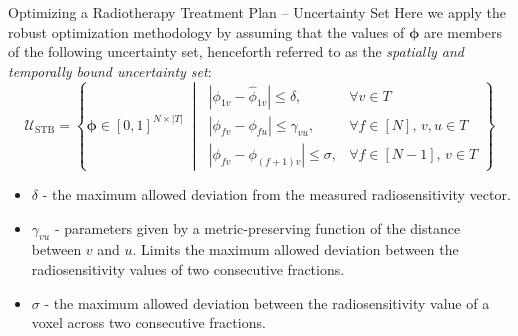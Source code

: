 \documentclass[11pt]{beamer}
\newcommand{\stb}{\mathcal{U}_{\text{STB}}}
\begin{document}
\begin{frame}{Optimizing a Radiotherapy Treatment Plan – Uncertainty Set}
        Here we apply the robust optimization methodology by assuming that the values of $\bm{\phi}$ are members of the following uncertainty set, henceforth referred to as the \textit{spatially and temporally bound uncertainty set}:
        \vspace{0.5em}
        \small{
        \[
        \stb =
        \left\{
        \bm{\phi} \in [0, 1]^{N \times |T|} \;\middle|\;
        \begin{array}{ll}
        |\phi_{1v} - \hat{\phi}_{1v}| \leq \delta, & \forall v \in T \\
        |\phi_{fv} - \phi_{fu}| \leq \gamma_{vu}, & \forall f \in [N],\, v, u \in T \\
        |\phi_{fv} - \phi_{(f+1)v}| \leq \sigma, & \forall f \in [N{-}1],\, v \in T
        \end{array}
        \right\}
        \]
        }
    \begin{itemize}
        \item $\delta$ - the maximum allowed deviation from the measured radiosensitivity vector.
        \item $\gamma_{vu}$ - parameters given by a metric-preserving function of the distance between $v$ and $u$. Limits the maximum allowed deviation between the radiosensitivity values of two consecutive fractions.
        \item $\sigma$ - the maximum allowed deviation between the radiosensitivity value of a voxel across two consecutive fractions.
    \end{itemize}
\end{frame}
\end{document}
